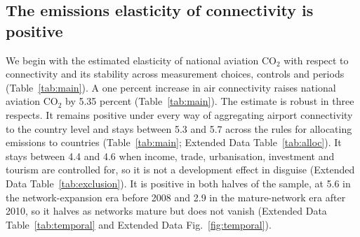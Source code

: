 \documentclass[12pt]{extarticle}
\begin{document}
\subsection*{The emissions elasticity of connectivity is positive}
We begin with the estimated elasticity of national aviation CO$_2$ with respect to connectivity and
its stability across measurement choices, controls and periods
(Table~\ref{tab:main}). A one percent increase in air connectivity raises national aviation CO$_2$
by 5.35 percent (Table~\ref{tab:main}). The estimate is
robust in three respects. It remains positive under every way of
aggregating airport connectivity to the country level and stays between
5.3 and 5.7 across the rules for allocating emissions to countries
(Table~\ref{tab:main}; Extended Data Table~\ref{tab:alloc}). It stays
between 4.4 and 4.6 when income, trade, urbanisation, investment and
tourism are controlled for, so it is not a development effect in disguise
(Extended Data Table~\ref{tab:exclusion}). It is positive in both halves
of the sample, at 5.6 in the network-expansion era before 2008 and 2.9 in
the mature-network era after 2010, so it halves as networks mature but
does not vanish (Extended Data Table~\ref{tab:temporal} and Extended Data
Fig.~\ref{fig:temporal}).
\end{document}
